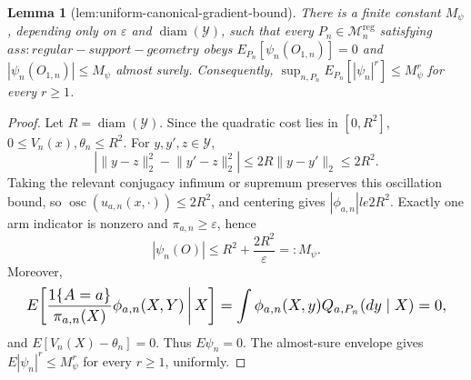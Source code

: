 \documentclass{article}
\newtheorem{lemma}{Lemma}
\begin{document}
\begin{lemma}[lem:uniform-canonical-gradient-bound]\label{lem:uniform-canonical-gradient-bound}
There is a finite constant \(M_\psi\), depending only on \(\varepsilon\) and \(\operatorname{diam}(\mathcal Y)\), such that every \(P_n\in\mathcal M_n^{\mathrm{reg}}\) satisfying \(ass:regular-support-geometry\) obeys \(E_{P_n}[\psi_n(O_{1,n})]=0\) and \(|\psi_n(O_{1,n})|\le M_\psi\) almost surely. Consequently, \(\sup_{n,P_n}E_{P_n}[|\psi_n|^r]\le M_\psi^r\) for every \(r\ge1\).
\end{lemma}
\begin{proof}
Let \(R=\operatorname{diam}(\mathcal Y)\). Since the quadratic cost lies in \([0,R^2]\), \(0\le V_n(x),\theta_n\le R^2\). For \(y,y',z\in\mathcal Y\),
\[|\lVert y-z\rVert_2^2-\lVert y'-z\rVert_2^2|\le2R\lVert y-y'\rVert_2\le2R^2.\]
Taking the relevant conjugacy infimum or supremum preserves this oscillation bound, so \(\operatorname{osc}(u_{a,n}(x,\cdot))\le2R^2\), and centering gives \(|\phi_{a,n}|le2R^2\). Exactly one arm indicator is nonzero and \(\pi_{a,n}\ge\varepsilon\), hence
\[|\psi_n(O)|\le R^2+\frac{2R^2}{\varepsilon}=:M_\psi.\]
Moreover,
\[
\makebox[\linewidth][c]{\resizebox{0.98\linewidth}{!}{\par\noindent \makebox[\linewidth][c]{\resizebox{0.98\linewidth}{!}{\(\displaystyle \displaystyle E\!\left[\frac{1\{A=a\}}{\pi_{a,n}(X)}\phi_{a,n}(X,Y)\,\middle|\,X\right]=\int\phi_{a,n}(X,y)Q_{a,P_n}(dy\mid X)=0,\)}}\par\noindent}}
\]
and \(E[V_n(X)-\theta_n]=0\). Thus \(E\psi_n=0\). The almost-sure envelope gives \(E|\psi_n|^r\le M_\psi^r\) for every \(r\ge1\), uniformly.
\end{proof}
\end{document}
